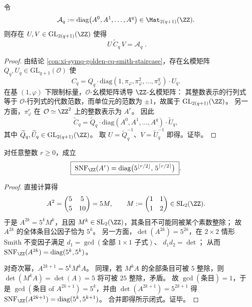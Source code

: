 \begin{conclusion}[整数层面的完全 \texorpdfstring{$(2\times2)$}{2x2} 块化：\texorpdfstring{$\widetilde C_q\sim \bigoplus_{r=0}^{q}A^r$}{Ctilde ~ ⊕ A^r}]\label{con:xi-symq-golden-cq-integer-2x2-blockization}
令
\[
\mathcal A_q:=\mathrm{diag}\bigl(A^{0},A^{1},\dots,A^{q}\bigr)\in\Mat_{2(q+1)}(\ZZ).
\]
则存在 \(U,V\in\mathrm{GL}_{2(q+1)}(\ZZ)\) 使得
\[
\boxed{\;
U\,\widetilde C_q\,V=\mathcal A_q\; }.
\]
\end{conclusion}
\begin{proof}
由结论 \ref{con:xi-symq-golden-cq-smith-staircase}，存在幺模矩阵 \(Q_q,U_q\in\mathrm{GL}_{q+1}(\mathcal O)\) 使
\[
C_q=Q_q\cdot \mathrm{diag}(1,\pi_\varphi,\pi_\varphi^2,\dots,\pi_\varphi^{q})\cdot U_q.
\]
在基 \((1,\varphi)\) 下限制标量，\(\mathcal O\)-幺模矩阵诱导 \(\ZZ\)-幺模矩阵：
其整数表示的行列式等于 \(\mathcal O\)-行列式的代数范数，而单位元的范数为 \(\pm 1\)，故属于 \(\mathrm{GL}_{2(q+1)}(\ZZ)\)。
另一方面，\(\pi_\varphi^{r}\) 在 \(\mathcal O\simeq \ZZ^2\) 上的整数表示为 \(A^r\)。
因此
\[
\widetilde C_q=\widetilde Q_q\cdot \mathrm{diag}(A^0,A^1,\dots,A^q)\cdot \widetilde U_q,
\]
其中 \(\widetilde Q_q,\widetilde U_q\in\mathrm{GL}_{2(q+1)}(\ZZ)\)。
取 \(U=\widetilde Q_q^{-1}\)、\(V=\widetilde U_q^{-1}\) 即得。证毕。
\end{proof}

\begin{proposition}\label{prop:xi-symq-golden-Ar-smith-closed-form}
对任意整数 \(r\ge 0\)，成立
\[
\boxed{\;
\mathrm{SNF}_{\ZZ}(A^{r})=\mathrm{diag}\bigl(5^{\lfloor r/2\rfloor},\,5^{\lceil r/2\rceil}\bigr)\; }.
\]
\end{proposition}
\begin{proof}
直接计算得
\[
A^2=
\begin{pmatrix}5&5\\[2pt]5&10\end{pmatrix}
=5M,
\qquad
M:=\begin{pmatrix}1&1\\[2pt]1&2\end{pmatrix}\in\mathrm{SL}_2(\ZZ).
\]
于是 \(A^{2k}=5^{k}M^{k}\)，且因 \(M^{k}\in\mathrm{SL}_2(\ZZ)\)，其条目不可能同被某个素数整除；
故 \(A^{2k}\) 的全体条目公因子恰为 \(5^{k}\)。
另一方面，\(\det(A^{2k})=5^{2k}\)，在 \(2\times 2\) 情形 Smith 不变因子满足
\(
d_1=\gcd(\text{全部 }1\times 1\text{ 子式})
\)、
\(
d_1d_2=\det
\)；
从而 \(\mathrm{SNF}_{\ZZ}(A^{2k})=\mathrm{diag}(5^{k},5^{k})\)。
\par
对奇次幂，\(A^{2k+1}=5^{k}M^{k}A\)。
同理，若 \(M^{k}A\) 的全部条目可被 \(5\) 整除，则 \(\det(M^{k}A)=\det(A)=5\) 将可被 \(25\) 整除，矛盾。
故 \(\gcd(\text{条目})=1\)，于是 \(\gcd(\text{条目 of }A^{2k+1})=5^{k}\)，并由 \(\det(A^{2k+1})=5^{2k+1}\) 得
\(\mathrm{SNF}_{\ZZ}(A^{2k+1})=\mathrm{diag}(5^{k},5^{k+1})\)。
合并即得所示闭式。证毕。
\end{proof}

